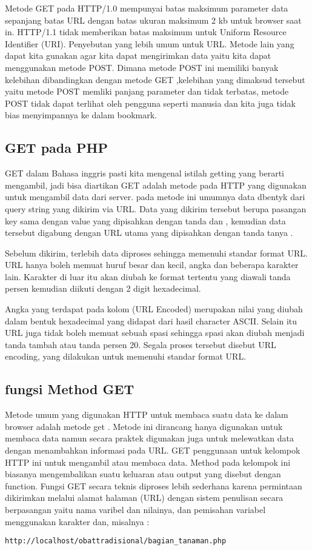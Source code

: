 Metode GET pada HTTP/1.0 mempunyai batas maksimum parameter data sepanjang batas URL dengan batas ukuran maksimum 2 kb untuk browser 
saat in. HTTP/1.1 tidak memberikan batas maksimum untuk Uniform Resource Identifier (URI). Penyebutan yang lebih umum untuk URL. Metode 
lain yang dapat kita gunakan agar kita dapat  mengirimkan data yaitu kita dapat menggunakan  metode POST. Dimana metode  POST ini 
memiliki banyak kelebihan dibandingkan dengan  metode GET ,kelebihan yang dimaksud tersebut yaitu metode POST  memliki panjang 
parameter dan tidak  terbatas,  metode POST tidak dapat terlihat oleh pengguna  seperti manusia dan  kita juga tidak bias menyimpannya 
ke dalam bookmark.

\subsection{GET pada PHP}
GET dalam Bahasa inggris pasti kita mengenal istilah getting yang berarti mengambil, jadi bisa diartikan GET adalah metode pada HTTP 
yang digunakan untuk mengambil data dari server. pada metode ini umumnya data dbentyk dari query string yang dikirim via URL. Data yang 
dikirim tersebut berupa pasangan key sama dengan value yang dipisahkan dengan tanda dan , kemudian data tersebut digabung dengan URL 
utama yang dipisahkan dengan tanda tanya . 

Sebelum dikirim, terlebih data diproses sehingga memenuhi standar format URL. URL hanya boleh memuat huruf besar dan kecil, angka dan 
beberapa karakter lain. Karakter di luar itu akan diubah ke format tertentu yang diawali tanda persen kemudian diikuti dengan 2 digit 
hexadecimal. 
 
Angka yang terdapat pada kolom (URL Encoded) merupakan nilai yang diubah dalam bentuk hexadecimal yang didapat dari hasil character 
ASCII. Selain itu URL juga tidak boleh memuat sebuah spasi sehingga spasi akan diubah menjadi tanda tambah atau tanda persen 20. Segala proses 
tersebut disebut URL encoding, yang dilakukan untuk memenuhi standar format URL.  
 
\subsection{fungsi Method GET}
Metode umum yang digunakan HTTP untuk membaca suatu data ke dalam browser adalah metode get . Metode ini dirancang hanya 
digunakan untuk membaca data namun secara praktek digunakan juga untuk melewatkan data dengan menambahkan informasi pada URL. 
GET penggunaan untuk kelompok HTTP ini untuk mengambil atau membaca data. Method pada kelompok ini biasanya mengembalikan suatu 
keluaran atau output yang  disebut dengan function.
Fungsi GET secara teknis diproses lebih sederhana karena permintaan dikirimkan melalui alamat halaman (URL) dengan sistem 
penulisan secara berpasangan yaitu nama varibel dan nilainya, dan pemisahan variabel menggunakan karakter dan, misalnya :
\begin{verbatim}
http://localhost/obattradisional/bagian_tanaman.php
\end{verbatim}

